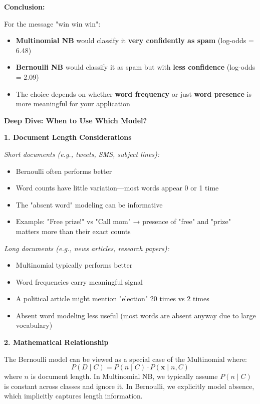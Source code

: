 \documentclass[12pt]{article}
\begin{document}
\begin{solution}
\textbf{Conclusion:}

For the message "win win win":
\begin{itemize}
    \item \textbf{Multinomial NB} would classify it \textbf{very confidently as spam} (log-odds = 6.48)
    \item \textbf{Bernoulli NB} would classify it as spam but with \textbf{less confidence} (log-odds = 2.09)
    \item The choice depends on whether \textbf{word frequency} or just \textbf{word presence} is more meaningful for your application
\end{itemize}
\end{solution}

\begin{explanation}
\textbf{Deep Dive: When to Use Which Model?}

\textbf{1. Document Length Considerations}

\textit{Short documents (e.g., tweets, SMS, subject lines):}
\begin{itemize}
    \item Bernoulli often performs better
    \item Word counts have little variation—most words appear 0 or 1 time
    \item The "absent word" modeling can be informative
    \item Example: "Free prize!" vs "Call mom" → presence of "free" and "prize" matters more than their exact counts
\end{itemize}

\textit{Long documents (e.g., news articles, research papers):}
\begin{itemize}
    \item Multinomial typically performs better
    \item Word frequencies carry meaningful signal
    \item A political article might mention "election" 20 times vs 2 times
    \item Absent word modeling less useful (most words are absent anyway due to large vocabulary)
\end{itemize}

\textbf{2. Mathematical Relationship}

The Bernoulli model can be viewed as a special case of the Multinomial where:
\[
P(D \mid C) = P(n \mid C) \cdot P(\mathbf{x} \mid n, C)
\]
where $n$ is document length. In Multinomial NB, we typically assume $P(n \mid C)$ is constant across classes and ignore it. In Bernoulli, we explicitly model absence, which implicitly captures length information.


\end{explanation}
\end{document}
